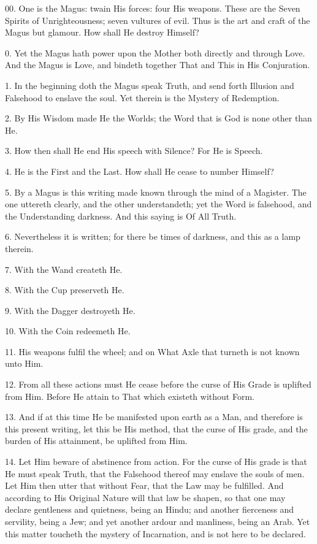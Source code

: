 
00. One is the Magus: twain His forces: four His weapons. These are the Seven Spirits of Unrighteousness; seven vultures of evil. Thus is the art and craft of the Magus but glamour. How shall He destroy Himself?

0. Yet the Magus hath power upon the Mother both directly and through Love. And the Magus is Love, and bindeth together That and This in His Conjuration.

1. In the beginning doth the Magus speak Truth, and send forth Illusion and Falsehood to enslave the soul. Yet therein is the Mystery of Redemption.

2. By His Wisdom made He the Worlds; the Word that is God is none other than He.

3. How then shall He end His speech with Silence? For He is Speech.

4. He is the First and the Last. How shall He cease to number Himself?

5. By a Magus is this writing made known through the mind of a Magister. The one uttereth clearly, and the other understandeth; yet the Word is falsehood, and the Understanding darkness. And this saying is Of All Truth.

6. Nevertheless it is written; for there be times of darkness, and this as a lamp therein.

7. With the Wand createth He.

8. With the Cup preserveth He.

9. With the Dagger destroyeth He.

10. With the Coin redeemeth He.

11. His weapons fulfil the wheel; and on What Axle that turneth is not known unto Him.

12. From all these actions must He cease before the curse of His Grade is uplifted from Him. Before He attain to That which existeth without Form.

13. And if at this time He be manifested upon earth as a Man, and therefore is this present writing, let this be His method, that the curse of His grade, and the burden of His attainment, be uplifted from Him.

14. Let Him beware of abstinence from action. For the curse of His grade is that He must speak Truth, that the Falsehood thereof may enslave the souls of men. Let Him then utter that without Fear, that the Law may be fulfilled. And according to His Original Nature will that law be shapen, so that one may declare gentleness and quietness, being an Hindu; and another fierceness and servility, being a Jew; and yet another ardour and manliness, being an Arab. Yet this matter toucheth the mystery of Incarnation, and is not here to be declared.

